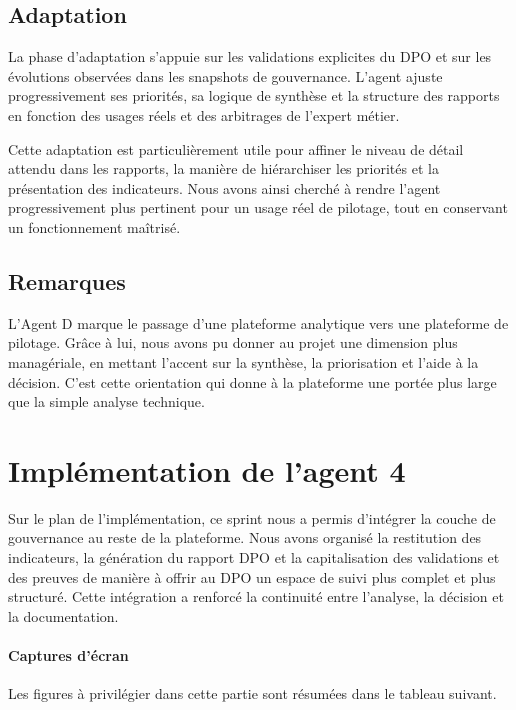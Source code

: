\documentclass[12pt,a4paper]{report}
\begin{document}
\subsection{Adaptation}

La phase d'adaptation s'appuie sur les validations explicites du DPO et sur les évolutions observées dans les snapshots de gouvernance. L'agent ajuste progressivement ses priorités, sa logique de synthèse et la structure des rapports en fonction des usages réels et des arbitrages de l'expert métier.

Cette adaptation est particulièrement utile pour affiner le niveau de détail attendu dans les rapports, la manière de hiérarchiser les priorités et la présentation des indicateurs. Nous avons ainsi cherché à rendre l'agent progressivement plus pertinent pour un usage réel de pilotage, tout en conservant un fonctionnement maîtrisé.

\subsection{Remarques}

L'Agent D marque le passage d'une plateforme analytique vers une plateforme de pilotage. Grâce à lui, nous avons pu donner au projet une dimension plus managériale, en mettant l'accent sur la synthèse, la priorisation et l'aide à la décision. C'est cette orientation qui donne à la plateforme une portée plus large que la simple analyse technique.

\section{Implémentation de l'agent 4}

Sur le plan de l'implémentation, ce sprint nous a permis d'intégrer la couche de gouvernance au reste de la plateforme. Nous avons organisé la restitution des indicateurs, la génération du rapport DPO et la capitalisation des validations et des preuves de manière à offrir au DPO un espace de suivi plus complet et plus structuré. Cette intégration a renforcé la continuité entre l'analyse, la décision et la documentation.

\paragraph{Captures d'écran}

Les figures à privilégier dans cette partie sont résumées dans le tableau suivant.
\end{document}

